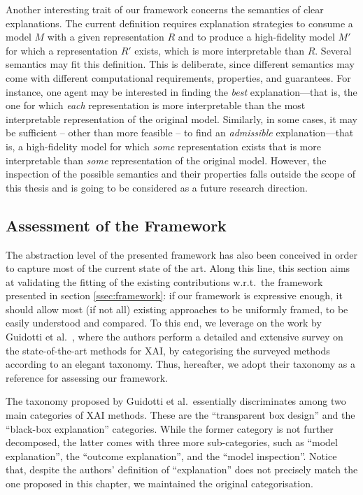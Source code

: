 \documentclass[12pt,a4paper,openright,twoside]{book}
\begin{document}
Another interesting trait of our framework concerns the semantics of clear explanations.
%
The current definition requires explanation strategies to consume a model $M$ with a given representation $R$ and to produce a high-fidelity model $M'$ for which a representation $R'$ exists, which is more interpretable than $R$.
%
Several semantics may fit this definition.
%
This is deliberate, since different semantics may come with different computational requirements, properties, and guarantees.
%
For instance, one agent may be interested in finding the \emph{best} explanation---that is, the one for which \emph{each} representation is more interpretable than the most interpretable representation of the original model.
%
Similarly, in some cases, it may be sufficient -- other than more feasible -- to find an \emph{admissible} explanation---that is, a high-fidelity model for which \emph{some} representation exists that is more interpretable than \emph{some} representation of the original model.
%
However, the inspection of the possible semantics and their properties falls outside the scope of this thesis and is going to be considered as a future research direction.

\subsection{Assessment of the Framework}\label{sec:validation}

The abstraction level of the presented framework has also been conceived in order to capture most of the current state of the art.
%
Along this line, this section aims at validating the fitting of the existing contributions w.r.t.\ the framework presented in section \cref{ssec:framework}: if our framework is expressive enough, it should allow most (if not all) existing approaches to be uniformly framed, to be easily understood and compared.
%
To this end, we leverage on the work by Guidotti et al.\ \cite{GuidottiMRTGP19}, where the authors perform a detailed and extensive survey on the state-of-the-art methods for XAI, by categorising the surveyed methods according to an elegant taxonomy.
%
Thus, hereafter, we adopt their taxonomy as a reference for assessing our framework.

The taxonomy proposed by Guidotti et al.\ essentially discriminates among two main categories of XAI methods.
%
These are the ``transparent box design'' and the ``black-box explanation'' categories.
%
While the former category is not further decomposed, the latter comes with three more sub-categories, such as ``model explanation'', the ``outcome explanation'', and the ``model inspection''.
%
Notice that, despite the authors' definition of ``explanation'' does not precisely match the one proposed in this chapter, we maintained the original categorisation.
\end{document}
